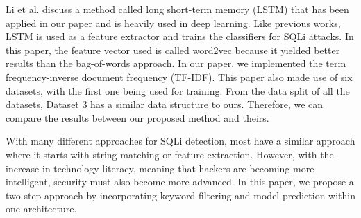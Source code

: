 \par Li et al. \cite{8616823} discuss a method called long short-term memory (LSTM) that has been applied in our paper and is heavily used in deep learning. Like previous works, LSTM is used as a feature extractor and trains the classifiers for SQLi attacks. In this paper, the feature vector used is called word2vec because it yielded better results than the bag-of-words approach. In our paper, we implemented the term frequency-inverse document frequency (TF-IDF). This paper also made use of six datasets, with the first one being used for training. From the data split of all the datasets, Dataset 3 has a similar data structure to ours. Therefore, we can compare the results between our proposed method and theirs.
\par With many different approaches for SQLi detection, most have a similar approach where it starts with string matching or feature extraction. However, with the increase in technology literacy, meaning that hackers are becoming more intelligent, security must also become more advanced. In this paper, we propose a two-step approach by incorporating keyword filtering and model prediction within one architecture.


